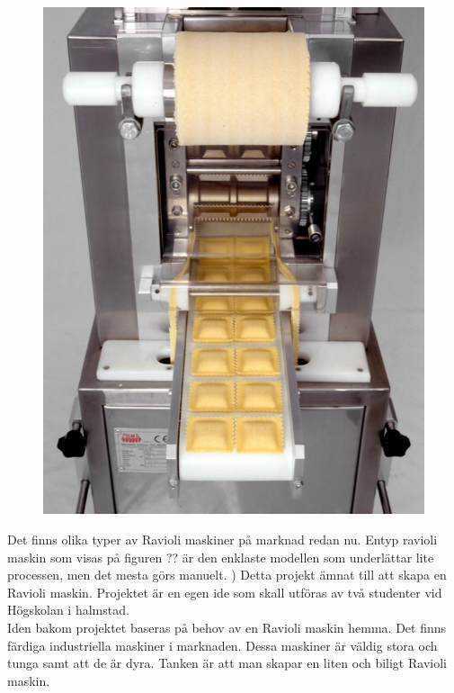 		\begin{figure}
			\includegraphics[scale=0.5]{images/pastamachine.jpg}	
		\end{figure}
		

Det finns olika typer av Ravioli maskiner på marknad redan nu. Entyp ravioli maskin som visas på figuren ?? är den enklaste modellen som underlättar lite processen, men det mesta görs manuelt. )
Detta projekt  ämnat till att skapa en Ravioli maskin. Projektet är en egen ide som skall utföras av två studenter vid Högskolan i halmstad.\\ 


Iden bakom projektet baseras på behov av en Ravioli maskin hemma.
Det finns färdiga industriella maskiner i marknaden. Dessa maskiner är väldig stora och tunga samt att de är dyra. 
Tanken är att man skapar en liten och biligt Ravioli maskin.		